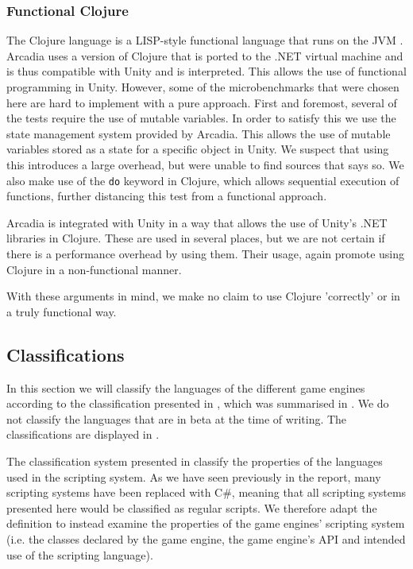 \subsubsection{Functional Clojure} 
The Clojure language is a LISP-style functional language that runs on the \ac{JVM} \cite{clojure:about}. Arcadia uses a version of Clojure that is ported to the .NET virtual machine and is thus compatible with Unity and is interpreted. This allows the use of functional programming in Unity. However, some of the microbenchmarks that were chosen here are hard to implement with a pure approach. First and foremost, several of the tests require the use of mutable variables. In order to satisfy this we use the state management system provided by Arcadia. This allows the use of mutable variables stored as a state for a specific object in Unity. 
We suspect that using this introduces a large overhead, but were unable to find sources that says so.
We also make use of the \texttt{do} keyword in Clojure, which allows sequential execution of functions, further distancing this test from a functional approach.

Arcadia is integrated with Unity in a way that allows the use of Unity's .NET libraries in Clojure.
These are used in several places, but we are not certain if there is a performance overhead by using them.
Their usage, again promote using Clojure in a non-functional manner. 

With these arguments in mind, we make no claim to use Clojure 'correctly' or in a truly functional way.

\subsection{Classifications}
In this section we will classify the languages of the different game engines according to the classification presented in \cite{5962102}, which was summarised in . We do not classify the languages that are in beta at the time of writing. The classifications are displayed in .

The classification system presented in \cite{5962102} classify the properties of the languages used in the scripting system. As we have seen previously in the report, many scripting systems have been replaced with C\#, meaning that all scripting systems presented here would be classified as regular scripts. We therefore adapt the definition to instead examine the properties of the game engines' scripting system (i.e. the classes declared by the game engine, the game engine's \ac{API} and intended use of the scripting language). 

